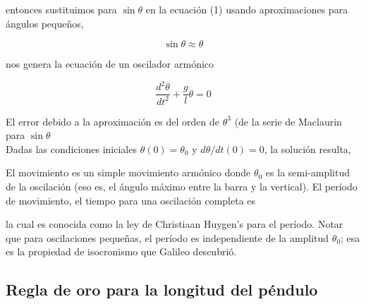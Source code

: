 \documentclass[DIV=calc, paper=a4, fontsize=12pt, twocolumn]{scrartcl}	 %
\begin{document}
entonces sustituimos para $\sin{\theta}$ en la ecuación (1) usando aproximaciones para ángulos pequeños,

$$\sin{\theta} \approx \theta $$

nos genera la ecuación de un oscilador armónico 

$$ \frac{d^{2}\theta}{dt^{2}} + \frac{g}{l}\theta = 0 $$

El error debido a la aproximación es del orden de $\theta^{3}$ (de la serie de Maclaurin para $\sin{\theta}$\\

Dadas las condiciones iniciales $\theta(0) = \theta_{0}$ y $d\theta/dt(0) = 0$, la solución resulta,

\begin{center}
{ \fboxsep 12pt
 }
\end{center}

El movimiento es un simple movimiento armónico donde $\theta_{0}$ es la semi-amplitud de la oscilación (eso es, el ángulo máximo entre la barra y la vertical). El período de movimiento, el tiempo para una oscilación completa es 

\begin{center}
{ \fboxsep 12pt
 }
\end{center}

la cual es conocida como la ley de Christiaan Huygen's para el período. Notar que para oscilaciones pequeñas, el período es independiente de la amplitud $\theta_{0}$; esa es la propiedad de isocronismo que Galileo descubrió.

\vspace{0.5cm}

\subsection*{Regla de oro para la longitud del péndulo}
\end{document}
